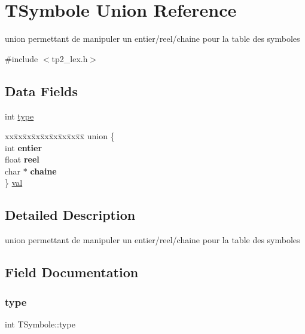 \hypertarget{structTSymbole}{}\section{T\+Symbole Union Reference}
\label{structTSymbole}


union permettant de manipuler un entier/reel/chaine pour la table des symboles  




{\ttfamily \#include $<$tp2\+\_\+lex.\+h$>$}

\subsection*{Data Fields}
\begin{DoxyCompactItemize}
\item 
int \hyperlink{structTSymbole_a3f1c09d456d42f56c7e97b767fcda611}{type}
\item 
\begin{tabbing}
xx\=xx\=xx\=xx\=xx\=xx\=xx\=xx\=xx\=\kill
union \{\\
\>int {\bfseries entier}\\
\>float {\bfseries reel}\\
\>char $\ast$ {\bfseries chaine}\\
\} \hyperlink{structTSymbole_a448dc40c2c8e5d050436fa598f528723}{val}\\

\end{tabbing}\end{DoxyCompactItemize}


\subsection{Detailed Description}
union permettant de manipuler un entier/reel/chaine pour la table des symboles 

\subsection{Field Documentation}
\mbox{\label{structTSymbole_a3f1c09d456d42f56c7e97b767fcda611}} 
\subsubsection{\texorpdfstring{type}{type}}
{\footnotesize\ttfamily int T\+Symbole\+::type}

